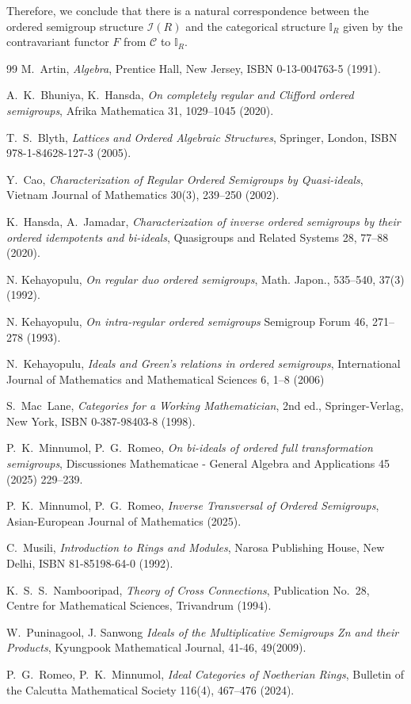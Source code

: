 \documentclass[12pt,a4paper]{amsart}
\theoremstyle{plain}
\theoremstyle{definition}
\begin{document}
Therefore, we conclude that there is a natural correspondence between the ordered semigroup structure $\mathcal{I}(R)$ and the categorical structure $\mathbb{I}_R$ given by the contravariant functor $F$ from $\mathcal{C}$ to $\mathbb{I}_R$.

	\begin{thebibliography}{99}
	  M.~Artin, \textit{Algebra}, Prentice Hall, New Jersey, ISBN 0-13-004763-5 (1991).
	
	 A.~K.~Bhuniya, K.~Hansda, \textit{On completely regular and Clifford ordered semigroups}, Afrika Mathematica 31, 1029--1045 (2020).
	
	   T.~S.~Blyth, \textit{Lattices and Ordered Algebraic Structures}, Springer, London, ISBN 978-1-84628-127-3 (2005).

	 Y.~Cao, \textit{Characterization of Regular Ordered Semigroups by Quasi-ideals}, Vietnam Journal of Mathematics 30(3), 239--250 (2002).
	
	
	 K.~Hansda, A.~Jamadar, \textit{Characterization of inverse ordered semigroups by their ordered idempotents and bi-ideals}, Quasigroups and Related Systems 28, 77--88 (2020).
	
	
	 N. Kehayopulu, \textit{On regular duo ordered semigroups}, Math. Japon., 535–540, 37(3) (1992).
	
	 N. Kehayopulu, \textit{ On intra-regular ordered semigroups} Semigroup Forum 46, 271–278 (1993).
	
	 N.~Kehayopulu, \textit{Ideals and Green's relations in ordered semigroups}, International Journal of Mathematics and Mathematical Sciences 6, 1--8 (2006)
	
	 S.~Mac~Lane, \textit{Categories for a Working Mathematician}, 2nd ed., Springer-Verlag, New York, ISBN 0-387-98403-8 (1998).
	
 P.~K.~Minnumol, P.~G.~Romeo, \textit {On bi-ideals of ordered full transformation semigroups}, Discussiones Mathematicae - General Algebra and Applications 45 (2025) 229–239.
	
	 P.~K.~Minnumol, P.~G.~Romeo, \textit{Inverse Transversal of Ordered Semigroups}, Asian-European Journal of Mathematics (2025).

	
	 C.~Musili, \textit{Introduction to Rings and Modules}, Narosa Publishing House, New Delhi, ISBN 81-85198-64-0 (1992).
	
	 K.~S.~S.~Nambooripad, \textit{Theory of Cross Connections}, Publication No.~28, Centre for Mathematical Sciences, Trivandrum (1994).
	
	 W.~Puninagool, J. Sanwong \textit{Ideals of the Multiplicative Semigroups Zn and their Products}, Kyungpook
	Mathematical Journal, 41-46, 49(2009).
	
	 P.~G.~Romeo, P.~K.~Minnumol, \textit{Ideal Categories of Noetherian Rings}, Bulletin of the Calcutta Mathematical Society 116(4), 467--476 (2024).
	

\end{thebibliography}
\end{document}
